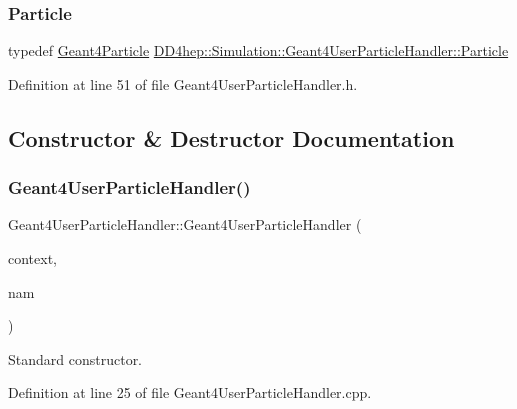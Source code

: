 \subsubsection{\texorpdfstring{Particle}{Particle}}
{\footnotesize\ttfamily typedef \hyperlink{class_d_d4hep_1_1_simulation_1_1_geant4_particle}{Geant4\+Particle} \hyperlink{class_d_d4hep_1_1_simulation_1_1_geant4_user_particle_handler_a0222f326d539ff27c6c446a7a30e8e26}{D\+D4hep\+::\+Simulation\+::\+Geant4\+User\+Particle\+Handler\+::\+Particle}}



Definition at line 51 of file Geant4\+User\+Particle\+Handler.\+h.



\subsection{Constructor \& Destructor Documentation}
\hypertarget{class_d_d4hep_1_1_simulation_1_1_geant4_user_particle_handler_aed274ebbaf0e9c9a1b336298cdbab183}{}\label{class_d_d4hep_1_1_simulation_1_1_geant4_user_particle_handler_aed274ebbaf0e9c9a1b336298cdbab183} 
\subsubsection{\texorpdfstring{Geant4\+User\+Particle\+Handler()}{Geant4UserParticleHandler()}}
{\footnotesize\ttfamily Geant4\+User\+Particle\+Handler\+::\+Geant4\+User\+Particle\+Handler (\begin{DoxyParamCaption}\item[{\hyperlink{class_d_d4hep_1_1_simulation_1_1_geant4_context}{Geant4\+Context} $\ast$}]{context,  }\item[{const std\+::string \&}]{nam }\end{DoxyParamCaption})}



Standard constructor. 



Definition at line 25 of file Geant4\+User\+Particle\+Handler.\+cpp.



